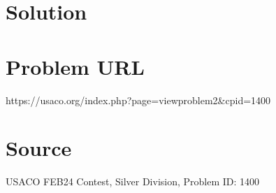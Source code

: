 \documentclass[12pt]{article}
\begin{document}
\section*{Solution}


\section*{Problem URL}
https://usaco.org/index.php?page=viewproblem2&cpid=1400

\section*{Source}
USACO FEB24 Contest, Silver Division, Problem ID: 1400
\end{document}
